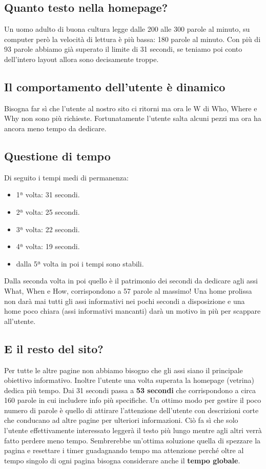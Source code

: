 			\subsection{Quanto testo nella homepage?} Un uomo adulto di buona cultura legge dalle 200 alle 300 parole al minuto, su computer però la velocità di lettura è più bassa: 180 parole al minuto. Con più di 93 parole abbiamo già superato il limite di 31 secondi, se teniamo poi conto dell'intero layout allora sono decisamente troppe.
			\subsection{Il comportamento dell'utente è dinamico} Bisogna far sì che l'utente al nostro sito ci ritorni ma ora le W di Who, Where e Why non sono più richieste. Fortunatamente l'utente salta alcuni pezzi ma ora ha ancora meno tempo da dedicare.
			
		\subsection{Questione di tempo}	
			Di seguito i tempi medi di permanenza:
			\begin{itemize}
				\item 1ª volta: 31 secondi.
				\item 2ª volta: 25 secondi.
				\item 3ª volta: 22 secondi.
				\item 4ª volta: 19 secondi.
				\item dalla 5ª volta in poi i tempi sono stabili.
			\end{itemize}
			Dalla seconda volta in poi quello è il patrimonio dei secondi da dedicare agli assi What, When e How, corrispondono a 57 parole al massimo!
			Una home prolissa non darà mai tutti gli assi informativi nei pochi secondi a disposizione e una home poco chiara (assi informativi mancanti) darà un motivo in più per scappare all'utente.
			
		\subsection{E il resto del sito?}
			Per tutte le altre pagine non abbiamo bisogno che gli assi siano il principale obiettivo informativo. Inoltre l'utente una volta superata la homepage (vetrina) dedica più tempo. Dai 31 secondi passa a \textbf{53 secondi} che corrispondono a circa 160 parole in cui includere info più specifiche.
			Un ottimo modo per gestire il poco numero di parole è quello di attirare l'attenzione dell'utente con descrizioni corte che conducano ad altre pagine per ulteriori informazioni. Ciò fa sì che solo l'utente effettivamente interessato leggerà il testo più lungo mentre agli altri verrà fatto perdere meno tempo.
			Sembrerebbe un'ottima soluzione quella di spezzare la pagina e resettare i timer guadagnando tempo ma attenzione perché oltre al tempo singolo di ogni pagina bisogna considerare anche il \textbf{tempo globale}.
			

